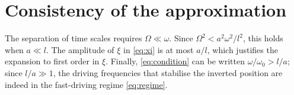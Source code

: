 \documentclass{article}
\begin{document}
\section{Consistency of the approximation}
The separation of time scales requires $\Omega \ll \omega$. Since $\Omega^2 < a^2\omega^2/l^2$, this holds when $a \ll l$. The amplitude of $\xi$ in \eqref{eq:xi} is at most $a/l$, which justifies the expansion to first order in $\xi$. Finally, \eqref{eq:condition} can be written $\omega/\omega_0 > l/a$; since $l/a \gg 1$, the driving frequencies that stabilise the inverted position are indeed in the fast-driving regime \eqref{eq:regime}.
\end{document}
